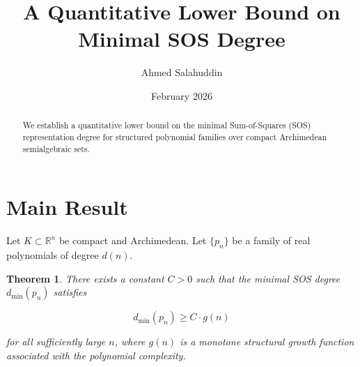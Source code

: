 \documentclass[11pt]{article}
\title{A Quantitative Lower Bound on Minimal SOS Degree}
\author{Ahmed Salahuddin}
\date{February 2026}
\newtheorem{theorem}{Theorem}
\begin{document}
\maketitle

\begin{abstract}
We establish a quantitative lower bound on the minimal Sum-of-Squares (SOS) 
representation degree for structured polynomial families over compact 
Archimedean semialgebraic sets.
\end{abstract}

\section{Main Result}

Let $K \subset \mathbb{R}^n$ be compact and Archimedean.
Let $\{p_n\}$ be a family of real polynomials of degree $d(n)$.

\begin{theorem}
There exists a constant $C > 0$ such that the minimal SOS degree 
$d_{\min}(p_n)$ satisfies

\[
d_{\min}(p_n) \ge C \cdot g(n)
\]

for all sufficiently large $n$, 
where $g(n)$ is a monotone structural growth function 
associated with the polynomial complexity.
\end{theorem}
\end{document}
